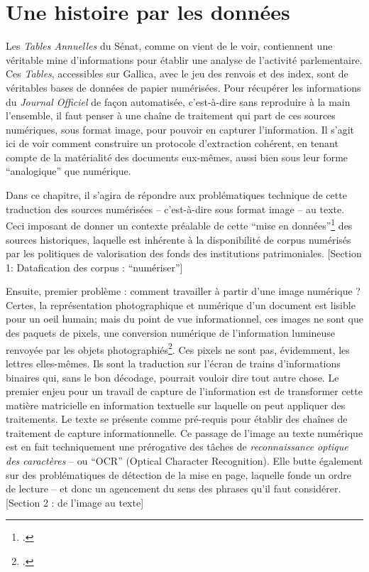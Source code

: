 \chapter{Une histoire par les données}

Les \emph{Tables Annuelles} du Sénat, comme on vient de le voir, contiennent une véritable mine d'informations pour établir une analyse de l'activité parlementaire. Ces \emph{Tables}, accessibles sur Gallica, avec le jeu des renvois et des index, sont de véritables bases de données de papier numérisées. Pour récupérer les informations du \emph{Journal Officiel} de façon automatisée, c'est-à-dire sans reproduire à la main l'ensemble, il faut penser à une chaîne de traitement qui part de ces sources numériques, sous format image, pour pouvoir en capturer l'information. Il s'agit ici de voir comment construire un protocole d’extraction cohérent, en tenant compte de la matérialité des documents eux-mêmes, aussi bien sous leur forme \enquote{analogique} que numérique. 

Dans ce chapitre, il s'agira de répondre aux problématiques technique de cette traduction des sources numérisées -- c'est-à-dire sous format image -- au texte. Ceci imposant de donner un contexte préalable de cette \enquote{mise en données}\footcite[][]{clavert} des sources historiques, laquelle est inhérente à la disponibilité de corpus numérisés par les politiques de valorisation des fonds des institutions patrimoniales. [Section 1: Datafication des corpus : \enquote{numériser}]

Ensuite, premier problème : comment travailler à partir d'une image numérique ? Certes, la représentation photographique et numérique d'un document est lisible pour un oeil humain; mais du point de vue informationnel, ces images ne sont que des paquets de pixels, une conversion numérique de l'information lumineuse renvoyée par les objets photographiés\footcite[][]{claerr}. Ces pixels ne sont pas, évidemment, les lettres elles-mêmes. Ils sont la traduction sur l'écran de trains d'informations binaires qui, sans le bon décodage, pourrait vouloir dire tout autre chose. Le premier enjeu pour un travail de capture de l'information est de transformer cette matière matricielle en information textuelle sur laquelle on peut appliquer des traitements. Le texte se présente comme pré-requis pour établir des chaînes de traitement de capture informationnelle. Ce passage de l'image au texte numérique est en fait techniquement une prérogative des tâches de \emph{reconnaissance optique des caractères} -- ou \enquote{OCR} (Optical Character Recognition). Elle butte également sur des problématiques de détection de la mise en page, laquelle fonde un ordre de lecture -- et donc un agencement du sens des phrases qu'il faut considérer. [Section 2 : de l'image au texte]

